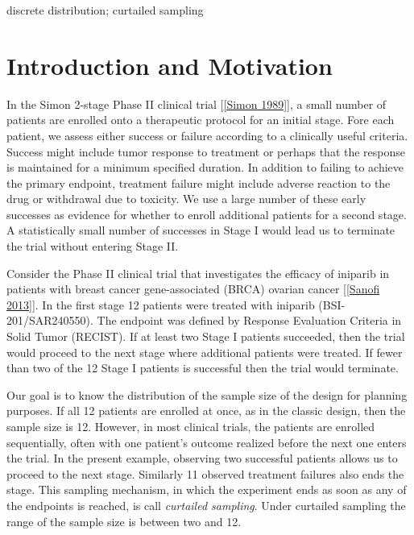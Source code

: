 \documentclass[12pt]{article}         %
\begin{document}
\bigskip

  discrete distribution; curtailed sampling


\thispagestyle{empty}
\setcounter{page}{1}

\section            {Introduction and Motivation}


In the Simon 2-stage Phase II clinical trial [\ref{Simon 1989}], a small 
number of patients are enrolled onto a therapeutic 
protocol for an initial stage. Fore each patient, we assess either success 
or failure according to a 
clinically useful criteria. Success might include tumor response to treatment
or perhaps that the response is maintained for a minimum specified duration.
In addition to failing to achieve the primary endpoint, treatment failure 
might include adverse reaction to the drug or withdrawal due to toxicity. We 
use a large number of these early successes as evidence for whether to enroll
additional patients for a second stage. A statistically small number of 
successes in Stage I would lead us to terminate the trial without entering 
Stage II.

Consider the Phase II clinical trial that investigates the efficacy of 
iniparib in patients with breast cancer gene-associated (BRCA) ovarian 
cancer [\ref{Sanofi 2013}]. In the first stage 12 patients were treated with 
iniparib (BSI-201/SAR240550). The endpoint was defined by Response Evaluation 
Criteria in Solid Tumor (RECIST). If at least two Stage I patients succeeded,
then the trial would proceed to the next stage where additional patients were 
treated. If fewer than two of the 12 Stage I patients is successful then 
the trial would terminate. 

Our goal is to know the distribution of the sample size of the design for 
planning purposes.  If all 12 patients are enrolled at once, as in the classic 
design, then the sample size is 12. However, in most clinical trials, the 
patients are enrolled sequentially, often with one patient's outcome realized 
before the next one enters the trial. In the present example, observing two 
successful patients allows us to proceed to the next stage. Similarly 11 
observed treatment failures also ends the stage. This sampling mechanism, in 
which the experiment ends as soon as any of the endpoints is reached, is 
call {\em curtailed sampling}. Under curtailed sampling the range of the 
sample size is between two and 12.
\end{document}
